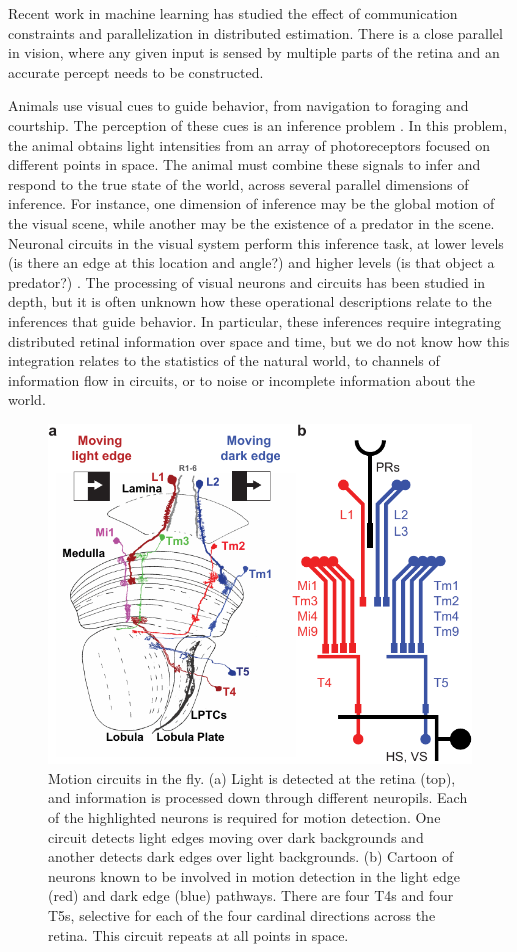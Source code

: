 
\label{sec:aim1}

Recent work in machine learning has studied the effect of
communication constraints and parallelization in distributed
estimation. There is a close parallel in vision, where any given input
is sensed by multiple parts of the retina and an accurate percept
needs to be constructed.


\biobackground{}
Animals use visual cues to guide behavior, from navigation to
foraging and courtship. The perception of these cues is an
inference problem \citep{knill:96}. In this problem, the
animal obtains light intensities from an array of
photoreceptors focused on different points in space. The animal must
combine these signals to infer
and respond to the true state of the world, across several
parallel dimensions of inference. For instance, one dimension of
inference may be the global motion of the visual scene, while
another may be the existence of a predator in the
scene. Neuronal circuits in the visual system perform this
inference task, at lower levels (is there an edge at this location
and angle?) and higher levels (is that object a predator?)
\citep{simoncelli:01}. The processing of 
visual neurons and circuits has been studied in depth, but it is
often unknown how these operational descriptions relate to the
inferences that guide behavior. In particular, these inferences
require integrating distributed retinal information over space and
time, but we do not know how this integration relates to the
statistics of the natural world, to channels of information flow
in circuits, or to noise or incomplete information about the world.

\setlength{\columnsep}{20pt}
\begin{figure}
\centering
\includegraphics[width=.44\textwidth]{figs/flysetup}
\caption{\small Motion circuits in the fly. (a) Light is detected at the
retina (top), and information is processed
down through different neuropils. Each of the highlighted
neurons is required for motion detection. One circuit 
detects light edges moving over dark backgrounds and another 
detects dark edges over light backgrounds. (b) Cartoon of
neurons known to be involved in motion detection in the light edge
(red) and dark edge (blue) pathways. 
There are four T4s and four T5s, selective for each
of the four cardinal directions across the retina. This circuit repeats at all
points in space.}
    \label{fig:setup}
    \vskip2pt
\end{figure}

